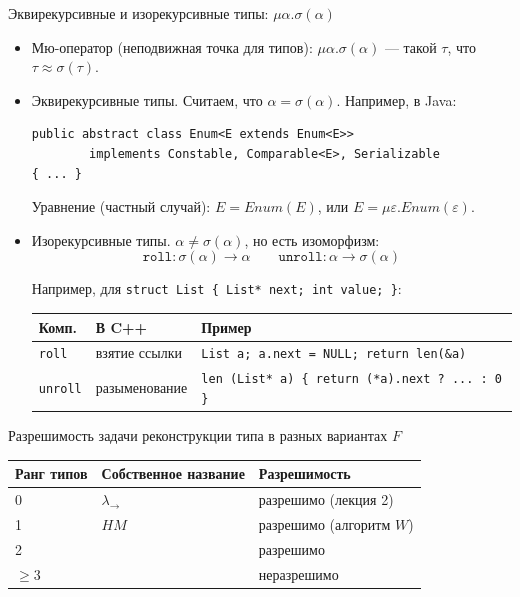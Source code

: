 \documentclass[aspectratio=169]{beamer}
\begin{document}
\begin{frame}[fragile]{Эквирекурсивные и изорекурсивные типы: $\mu\alpha.\sigma(\alpha)$}
\begin{itemize}
\item Мю-оператор (неподвижная точка для типов): $\mu\alpha.\sigma(\alpha)$ --- такой $\tau$, что $\tau \approx \sigma(\tau)$.
\item Эквирекурсивные типы. Считаем, что $\alpha = \sigma(\alpha)$.
Например, в Java:
\begin{verbatim}
public abstract class Enum<E extends Enum<E>>
        implements Constable, Comparable<E>, Serializable 
{ ... }
\end{verbatim}

Уравнение (частный случай): $E = Enum(E)$, или $E = \mu \varepsilon . Enum(\varepsilon)$.

\item Изорекурсивные типы. $\alpha \ne \sigma(\alpha)$, но есть изоморфизм:
 $$\texttt{roll}: \sigma(\alpha)\rightarrow\alpha\quad\quad\texttt{unroll}: \alpha\rightarrow\sigma(\alpha)$$

Например, для \verb!struct List { List* next; int value; }!:

\begin{center}\begin{tabular}{lll}
Комп. & В C++ & Пример \\\hline
\verb!roll! & взятие ссылки & \small\verb!List a; a.next = NULL; return len(!\color{blue}\verb!&a!\color{black}\verb!)!\\
\verb!unroll! & разыменование & \small\verb!len (List* a) { return (!\color{blue}\verb!*a!\color{black}\verb!).next ? ... : 0 }!
\end{tabular}\end{center}

\end{itemize}
\end{frame}

\begin{frame}{Разрешимость задачи реконструкции типа в разных вариантах $F$}
\begin{tabular}{lll}
Ранг типов & Собственное название & Разрешимость\\\hline
0 & $\lambda_\rightarrow$ & разрешимо (лекция 2)\\
1 & $HM$ & разрешимо (алгоритм $W$)\\
2 & & разрешимо\\
$\ge3$ & & неразрешимо
\end{tabular}
\end{frame}
\end{document}
